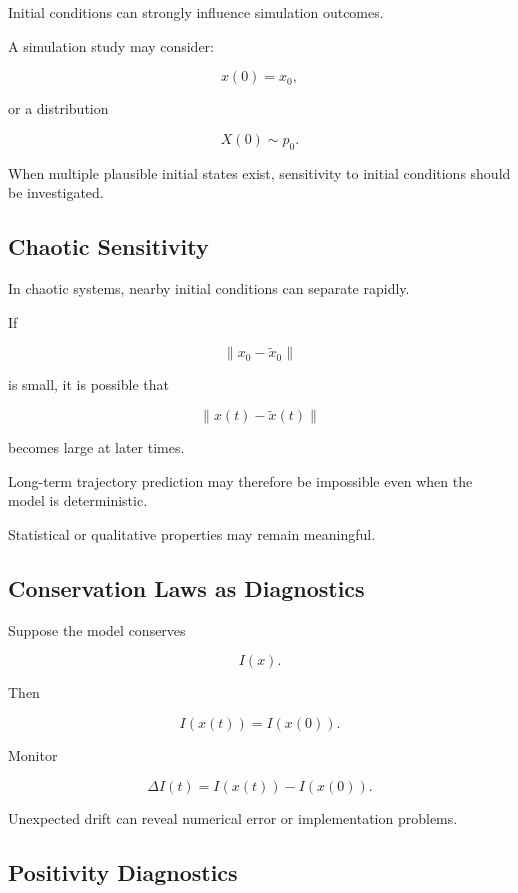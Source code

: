 Initial conditions can strongly influence simulation outcomes.

A simulation study may consider:

\[
\boxed{
x(0)=x_0,
}
\]

or a distribution

\[
\boxed{
X(0)\sim p_0.
}
\]

When multiple plausible initial states exist, sensitivity to initial
conditions should be investigated.

\subsection{Chaotic Sensitivity}
\label{subsec:chaotic-simulation-sensitivity}

In chaotic systems, nearby initial conditions can separate rapidly.

If

\[
\|x_0-\widetilde{x}_0\|
\]

is small, it is possible that

\[
\boxed{
\|x(t)-\widetilde{x}(t)\|
}
\]

becomes large at later times.

Long-term trajectory prediction may therefore be impossible even when the
model is deterministic.

Statistical or qualitative properties may remain meaningful.

\subsection{Conservation Laws as Diagnostics}
\label{subsec:simulation-conservation-diagnostics}

Suppose the model conserves

\[
I(x).
\]

Then

\[
\boxed{
I(x(t))
=
I(x(0)).
}
\]

Monitor

\[
\boxed{
\Delta I(t)
=
I(x(t))-I(x(0)).
}
\]

Unexpected drift can reveal numerical error or implementation problems.

\subsection{Positivity Diagnostics}
\label{subsec:simulation-positivity}

